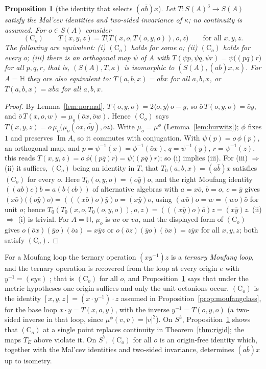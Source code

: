 \documentclass[11pt,reqno]{amsart}
\newtheorem{proposition}[theorem]{Proposition}
\theoremstyle{definition}
\theoremstyle{remark}
\numberwithin{equation}{section}
\newcommand{\HH}{\mathbb{H}}
\newcommand{\im}{\operatorname{Im}}
\newcommand{\ip}[2]{\langle #1,#2\rangle}
\newcommand{\hp}[3]{[#1,#2,#3]}
\begin{document}
\begin{proposition}[the identity that selects $(a\bar b)x$]\label{prop:C}
Let $T\colon S(A)^3\to S(A)$ satisfy the Mal'cev identities and two-sided invariance of $\kappa$; no continuity is assumed.  For
$o\in S(A)$ consider
\[
(\mathrm C_o)\qquad T(x,y,z)=T\bigl(T(x,o,T(o,y,o)),o,z\bigr)\qquad\text{for all }x,y,z.
\]
The following are equivalent: (i) $(\mathrm C_o)$ holds for some $o$; (ii) $(\mathrm C_o)$ holds for every $o$; (iii) there is an orthogonal
map $\psi$ of $A$ with $T(\psi p,\psi q,\psi r)=\psi\bigl((p\bar q)r\bigr)$ for all $p,q,r$, that is, $(S(A),T,\kappa)$ is isomorphic to
$(S(A),(a\bar b)x,\kappa)$.  For $A=\HH$ they are also equivalent to: $T(a,b,x)=a\bar bx$ for all $a,b,x$, or $T(a,b,x)=x\bar ba$ for all
$a,b,x$.
\end{proposition}
\begin{proof}
By Lemma~\ref{lem:normal}, $T(o,y,o)=2\ip oy\,o-y$, so $\bar o\,T(o,y,o)=\overline{\bar oy}$, and $\bar o\,T(x,o,w)=\mu_o(\bar ox,\bar ow)$.  Hence
$(\mathrm C_o)$ says $T(x,y,z)=o\,\mu_o\bigl(\mu_o(\bar ox,\overline{\bar oy}),\bar oz\bigr)$.  Write $\mu_o=\mu^\phi$ (Lemma~\ref{lem:hurwitz}); $\phi$ fixes $1$
and preserves $\im A$, so it commutes with conjugation.  With $\psi(p)=o\,\phi(p)$, an orthogonal map, and $p=\psi^{-1}(x)=\phi^{-1}(\bar ox)$,
$q=\psi^{-1}(y)$, $r=\psi^{-1}(z)$, this reads $T(x,y,z)=o\,\phi\bigl((p\bar q)r\bigr)=\psi\bigl((p\bar q)r\bigr)$; so (i) implies (iii).  For (iii)
$\Rightarrow$ (ii) it suffices, $(\mathrm C_o)$ being an identity in $T$, that $T_0(a,b,x)=(a\bar b)x$ satisfies $(\mathrm C_o)$ for every $o$.  Here
$T_0(o,y,o)=(o\bar y)o$, and the right Moufang identity $((ab)c)b=a(b(cb))$ of alternative algebras \cite{Schafer66} with $a=x\bar o$, $b=o$,
$c=\bar y$ gives $(x\bar o)\bigl((o\bar y)o\bigr)=(((x\bar o)o)\bar y)o=(x\bar y)o$, using $(w\bar o)o=w=(wo)\bar o$ for unit $o$; hence
$T_0(T_0(x,o,T_0(o,y,o)),o,z)=(((x\bar y)o)\bar o)z=(x\bar y)z$.  (ii) $\Rightarrow$ (i) is trivial.  For $A=\HH$, $\mu_o$ is $uv$ or $vu$, and
the displayed form of $(\mathrm C_o)$ gives $o(\bar ox)(\bar yo)(\bar oz)=x\bar yz$ or $o(\bar oz)(\bar yo)(\bar ox)=z\bar yx$ for all $x,y,z$;
both satisfy $(\mathrm C_o)$.
\end{proof}

For a Moufang loop the ternary operation $(xy^{-1})z$ is a \emph{ternary Moufang loop}, and the ternary operation is recovered from the
loop at every origin $e$ with $y^{-1}=(eye)$ \cite[Lemma~3.4 and Remark~(3)]{BK12}; that is $(\mathrm C_o)$ for all $o$, and Proposition~\ref{prop:C}
says that under the metric hypotheses one origin suffices and only the unit octonions occur.  $(\mathrm C_o)$ is the identity
$\hp xyz=(x\cdot y^{-1})\cdot z$ assumed in Proposition~\ref{prop:moufangclass}, for the base loop
$x\cdot y=T(x,o,y)$, with the inverse $y^{-1}=T(o,y,o)$ (a two-sided inverse in that loop, since $\mu^\phi(v,\bar v)=\lvert v\rvert^2$).  On $S^3$,
Proposition~\ref{prop:C} shows that $(\mathrm C_o)$ at a single point replaces continuity in Theorem~\ref{thm:rigid}; the maps $T_E$ above
violate it.  On $S^7$, $(\mathrm C_o)$ for all $o$ is an origin-free identity which, together with the Mal'cev identities and two-sided
invariance, determines $(a\bar b)x$ up to isometry.
\end{document}
